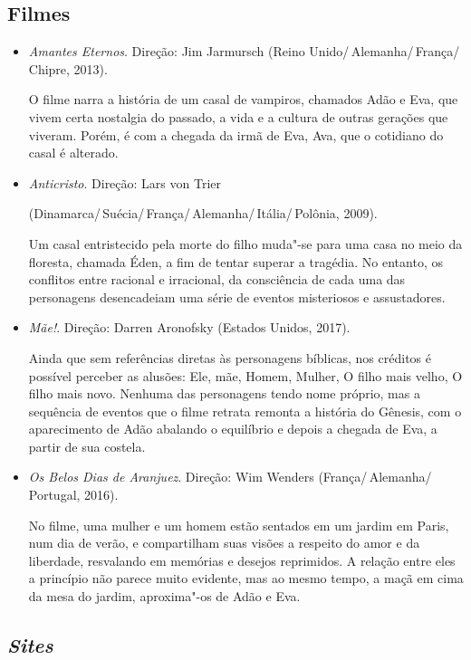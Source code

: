 \documentclass[12pt]{extarticle}
\begin{document}
\subsection{Filmes}

\begin{itemize}
\item\textit{Amantes Eternos}. Direção: Jim Jarmursch (Reino Unido/\,Alemanha/\,França/\,Chipre, 2013).

O filme narra a história de um casal de vampiros, chamados Adão e Eva, que vivem certa nostalgia 
do passado, a vida e a cultura de outras gerações que viveram. Porém, é com a chegada da irmã de Eva, Ava, 
que o cotidiano do casal é alterado.

\item\textit{Anticristo}. Direção: Lars von Trier 


(Dinamarca/\,Suécia/\,França/\,Alemanha/\,Itália/\,Polônia, 2009). 

Um casal entristecido pela morte do filho muda"-se para uma casa no meio da floresta, chamada Éden, 
a fim de tentar superar a tragédia. No entanto, os conflitos entre racional e irracional, da consciência 
de cada uma das personagens desencadeiam uma série de eventos misteriosos e assustadores.

\item\textit{Mãe!}. Direção: Darren Aronofsky (Estados Unidos, 2017).

Ainda que sem referências diretas às personagens bíblicas, nos créditos é possível perceber as alusões: 
Ele, mãe, Homem, Mulher, O filho mais velho, O filho mais novo. Nenhuma das personagens tendo nome próprio, 
mas a sequência de eventos que o filme retrata remonta a história do Gênesis, com o aparecimento de Adão 
abalando o equilíbrio e depois a chegada de Eva, a partir de sua costela.

\item\textit{Os Belos Dias de Aranjuez}. Direção: Wim Wenders (França/\,Alemanha/\,Portugal, 2016).

No filme, uma mulher e um homem estão sentados em um jardim em Paris, num dia de verão, e 
compartilham suas visões a respeito do amor e da liberdade, resvalando em memórias e desejos 
reprimidos. A relação entre eles a princípio não parece muito evidente, mas ao mesmo tempo, 
a maçã em cima da mesa do jardim, aproxima"-os de Adão e Eva.
\end{itemize}


\subsection{\emph{Sites}}
\end{document}
